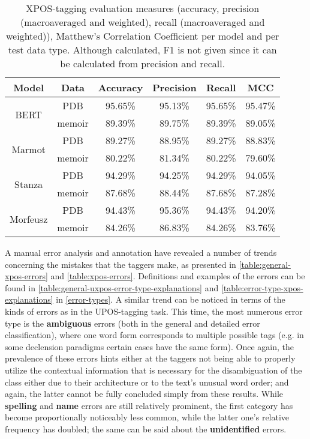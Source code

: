\renewcommand{\arraystretch}{1.25}
\begin{table}[H]
\begin{center}
\begin{tabular}{|cc|cccc|}
\hline \bf Model & \bf Data & \bf Accuracy & \bf Precision & \bf Recall & \bf MCC \\ \hline
\multirow{2}{4em}{BERT}
& PDB & 95.65\% & 95.13\% & 95.65\% & 95.47\% \\
& memoir & 89.39\% & 89.75\% & 89.39\% & 89.05\%  \\
\multirow{2}{4em}{Marmot}
& PDB & 89.27\% & 88.95\% & 89.27\% & 88.83\% \\
& memoir & 80.22\% & 81.34\% & 80.22\% & 79.60\% \\
\multirow{2}{4em}{Stanza}
& PDB & 94.29\% & 94.25\% & 94.29\% & 94.05\% \\
& memoir & 87.68\% & 88.44\% & 87.68\% & 87.28\% \\
\multirow{2}{4em}{Morfeusz}
& PDB & 94.43\% & 95.36\% & 94.43\% & 94.20\% \\
& memoir & 84.26\% & 86.83\% & 84.26\% & 83.76\% \\ 
\hline
\end{tabular}
\caption{\label{table:xpos} XPOS-tagging evaluation measures (accuracy, precision (macroaveraged and weighted), recall (macroaveraged and weighted)), Matthew's Correlation Coefficient per model and per test data type. Although calculated, F1 is not given since it can be calculated from precision and recall.}
\end{center}
\end{table}

A manual error analysis and annotation have revealed a number of trends concerning the mistakes that the taggers make, as presented in \autoref{table:general-xpos-errors} and \autoref{table:xpos-errors}. Definitions and examples of the errors can be found in \autoref{table:general-uxpos-error-type-explanations} and \autoref{table:error-type-xpos-explanations} in \autoref{error-types}. A similar trend can be noticed in terms of the kinds of errors as in the UPOS-tagging task. This time, the most numerous error type is the \textbf{ambiguous} errors (both in the general and detailed error classification), where one word form corresponds to multiple possible tags (e.g. in some declension paradigms certain cases have the same form). Once again, the prevalence of these errors hints either at the taggers not being able to properly utilize the contextual information that is necessary for the disambiguation of the class either due to their architecture or to the text's unusual word order; and again, the latter cannot be fully concluded simply from these results. While \textbf{spelling} and \textbf{name} errors are still relatively prominent, the first category has become proportionally noticeably less common, while the latter one's relative frequency has doubled; the same can be said about the \textbf{unidentified} errors. 

